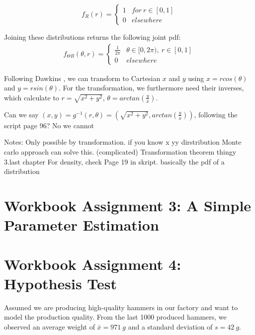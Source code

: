 \begin{equation}
f_R(r) = 
\begin{cases} 
      1 & for~r\in[0,1]\\
      0&elsewhere
   \end{cases}
\label{eq:r_untransformed}
\end{equation}

Joining these distributions returns the following joint pdf:
\begin{equation}
\begin{split}
f_{\Theta R}(\theta,r) = 
\begin{cases} 
      \frac{1}{2\pi} & \theta \in [0,2\pi),~ r\in[0,1]\\
      0&elsewhere
   \end{cases}
\end{split}
\label{eq:joint_pdf_untransformed}
\end{equation}

Following Dawkins \cite{dawkins}, we can transform to Cartesian $x$ and $y$ using $x = rcos(\theta)$ and $y=rsin(\theta)$. For the transformation, we furthermore need their inverses, which calculate to $r = \sqrt{x^2 + y^2}$, $\theta = arctan(\frac{y}{x})$. 

Can we say $(x,y) = g^{-1}(r,\theta) = (\sqrt{x^2 + y^2},arctan(\frac{y}{x}))$, following the script page 96? No we cannot



Notes:
Only possible by transformation. if you know x yy dirstribution 
Monte carlo approach can solve this. (complicated)
Transformation theorem thingy 3.last chapter
For density, check Page 19 in skript. basically the pdf of a distribution




\chapter{Workbook Assignment 3: A Simple Parameter Estimation}	
\chapter{Workbook Assignment 4: Hypothesis Test}	

Assumed we are producing high-quality hammers in our factory and want to model the production quality. From the last 1000 produced hammers, we observed an average weight of $\bar{x}=971~g$ and a standard deviation of $s=42~g$.

